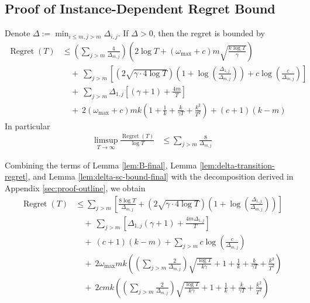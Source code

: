 \documentclass[opre,blindrev]{informs3}
\newcommand{\Regret}{\operatorname{Regret}}
\begin{document}
\begin{APPENDICES}
\section{Proof of Instance-Dependent Regret Bound}\label{sec:delta-all-constants}
\begin{theorem}
    Denote \(\Delta:=\min_{i\leq m, j>m}\Delta_{i,j}\). If \(\Delta>0\), then the regret is bounded by
    \begin{align*}
        \Regret(T)&\leq \left(\sum_{j>m}\frac{4}{\Delta_{m,j}}\right) \left( 2\log T+(\omega_{\max}+c)m\sqrt{\frac{k\log T}{\gamma }}\right)\\
        &\quad +~ \sum_{j>m} \left[\left(2\sqrt{\gamma \cdot 4\log T}\right)\left(1+\log\left(\frac{\Delta_{1,j}}{\Delta_{m,j}}\right)\right)+c\log\left(\frac{c}{\Delta_{m,j}}\right)\right]\\
        & \quad + ~\sum_{j>m} \Delta_{1,j} \left[(\gamma + 1) + \frac{4m}{T}\right]\\
        &\quad +~2(\omega_{\max}+c)mk\left(1+\frac{1}{k}+\frac{k}{\gamma T}+\frac{k^2}{T^2}\right) + (c+1)(k-m)
    \end{align*}
    In particular
    \begin{align*}
        \limsup_{T\to\infty}\frac{\Regret(T)}{\log T}&\leq \sum_{j>m} \frac{8}{\Delta_{m,j}}
    \end{align*}
\end{theorem}
    Combining the terms of Lemma \ref{lem:B-final}, Lemma \ref{lem:delta-transition-regret}, and Lemma \ref{lem:delta-sc-bound-final} with the decomposition derived in Appendix \ref{sec:proof-outline}, we obtain
    \begin{align*}
        \Regret(T)&\leq  \sum_{j>m} \left[\frac{8\log T}{\Delta_{m,j}}+ \left(2\sqrt{\gamma \cdot 4\log T}\right)\left(1+\log\left(\frac{\Delta_{1,j}}{\Delta_{m,j}}\right)\right)\right]\\
        & \quad + ~\sum_{j>m} \left[\Delta_{1,j}(\gamma + 1) + \frac{4m\Delta_{1,j}}{T}\right]\\
        &\quad +~ (c+1)(k-m) +\sum_{j>m}c\log\left(\frac{c}{\Delta_{m,j}}\right)\\
        &\quad + ~ 2\omega_{\max}mk\left(\left(\sum_{j>m}\frac{2}{\Delta_{m,j}}\right)\sqrt{\frac{\log T}{k\gamma}}+1+\frac{1}{k}+\frac{k}{\gamma T}+\frac{k^2}{T^2}\right)\\
        &\quad +~2cmk\left(\left(\sum_{j>m}\frac{2}{\Delta_{m,j}}\right)\sqrt{\frac{\log T}{k\gamma}}+1+\frac{1}{k}+\frac{k}{\gamma T}+\frac{k^2}{T^2}\right)

\end{align*}
\end{APPENDICES}
\end{document}
